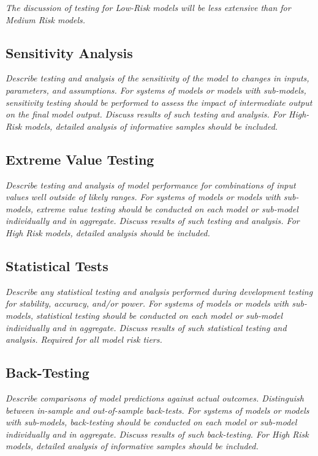 \documentclass[12pt,letterpaper]{article}
\begin{document}
\textit{The discussion of testing for Low-Risk models will be less extensive than for Medium Risk models.}

\subsection{Sensitivity Analysis}
\textit{Describe testing and analysis of the sensitivity of the model to changes in inputs, parameters, and assumptions. For systems of models or models with sub-models, sensitivity testing should be performed to assess the impact of intermediate output on the final model output. Discuss results of such testing and analysis. For High-Risk models, detailed analysis of informative samples should be included.}

\subsection{Extreme Value Testing}
\textit{Describe testing and analysis of model performance for combinations of input values well outside of likely ranges. For systems of models or models with sub-models, extreme value testing should be conducted on each model or sub-model individually and in aggregate. Discuss results of such testing and analysis. For High Risk models, detailed analysis should be included.}

\subsection{Statistical Tests}
\textit{Describe any statistical testing and analysis performed during development testing for stability, accuracy, and/or power. For systems of models or models with sub-models, statistical testing should be conducted on each model or sub-model individually and in aggregate. Discuss results of such statistical testing and analysis. Required for all model risk tiers.}

\subsection{Back-Testing}
\textit{Describe comparisons of model predictions against actual outcomes. Distinguish between in-sample and out-of-sample back-tests. For systems of models or models with sub-models, back-testing should be conducted on each model or sub-model individually and in aggregate. Discuss results of such back-testing. For High Risk models, detailed analysis of informative samples should be included.}
\end{document}

